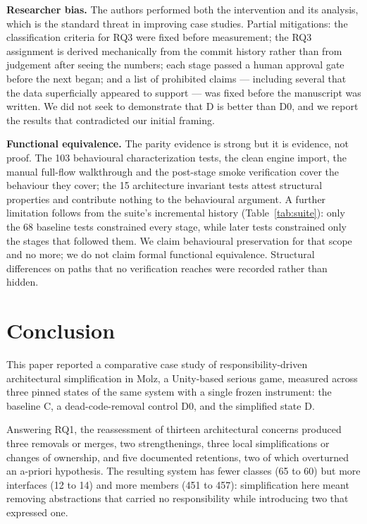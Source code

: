 \documentclass[pdflatex,sn-basic]{sn-jnl}
\begin{document}
\medskip\noindent\textbf{Researcher bias.} The authors performed both the intervention and its analysis, which is the standard threat in improving case studies. Partial mitigations: the classification criteria for RQ3 were fixed before measurement; the RQ3 assignment is derived mechanically from the commit history rather than from judgement after seeing the numbers; each stage passed a human approval gate before the next began; and a list of prohibited claims --- including several that the data superficially appeared to support --- was fixed before the manuscript was written. We did not seek to demonstrate that D is better than D0, and we report the results that contradicted our initial framing.

\medskip\noindent\textbf{Functional equivalence.} The parity evidence is strong but it is evidence, not proof. The 103 behavioural characterization tests, the clean engine import, the manual full-flow walkthrough and the post-stage smoke verification cover the behaviour they cover; the 15 architecture invariant tests attest structural properties and contribute nothing to the behavioural argument. A further limitation follows from the suite's incremental history (Table~\ref{tab:suite}): only the 68 baseline tests constrained every stage, while later tests constrained only the stages that followed them. We claim behavioural preservation for that scope and no more; we do not claim formal functional equivalence. Structural differences on paths that no verification reaches were recorded rather than hidden.


\FloatBarrier

\section{Conclusion}\label{sec:conclusion}

This paper reported a comparative case study of responsibility-driven architectural simplification in Molz, a Unity-based serious game, measured across three pinned states of the same system with a single frozen instrument: the baseline C, a dead-code-removal control D0, and the simplified state D.

Answering RQ1, the reassessment of thirteen architectural concerns produced three removals or merges, two strengthenings, three local simplifications or changes of ownership, and five documented retentions, two of which overturned an a-priori hypothesis. The resulting system has fewer classes (65 to 60) but more interfaces (12 to 14) and more members (451 to 457): simplification here meant removing abstractions that carried no responsibility while introducing two that expressed one.
\end{document}
